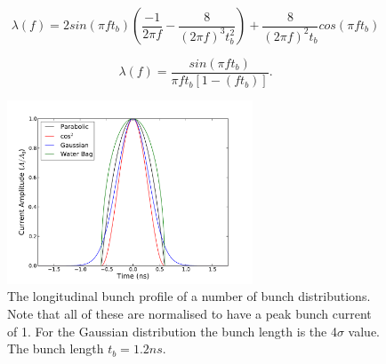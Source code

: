 \documentclass{cernyrep}
\begin{document}
\begin{equation}
 \lambda \left( f \right) = 2 sin \left( \pi f t_{b} \right) \left( \frac{-1}{2 \pi f} - \frac{8}{\left( 2 \pi f \right)^{3}t_{b}^{2} }  \right) + \frac{8}{\left( 2 \pi f \right)^{2} t_{b}} cos \left( \pi f t_{b} \right)
\label{eqn:para_profile_freq}
\end{equation}

\begin{equation}
\lambda \left( f \right)  = \frac{sin \left( \pi f t_{b} \right)}{\pi f t_{b} \left[ 1 - \left( f t_{b} \right) \right]}.
\label{eqn:cos_profile_freq}
\end{equation}

\begin{figure}
\begin{center}
\includegraphics[width=0.65\textwidth]{figures/bunch_profile_12ns.pdf}
\end{center}
\caption{The longitudinal bunch profile of a number of bunch distributions. Note that all of these are normalised to have a peak bunch current of 1. For the Gaussian distribution the bunch length is the 4$\sigma$ value. The bunch length $t_{b} = 1.2ns$.}
\label{fig:time_bunch_profiles}
\end{figure}
\end{document}
